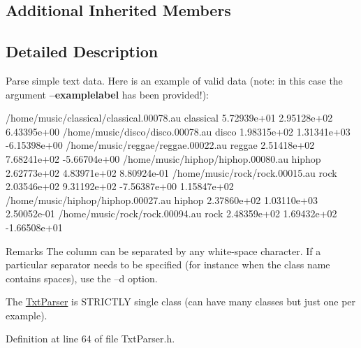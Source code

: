 \subsection*{Additional Inherited Members}


\subsection{Detailed Description}
Parse simple text data. Here is an example of valid data (note\-: in this case the argument {\bfseries --examplelabel} has been provided!)\-: \begin{DoxyVerb}/home/music/classical/classical.00078.au       classical       5.72939e+01     2.95128e+02     6.43395e+00
/home/music/disco/disco.00078.au       disco   1.98315e+02     1.31341e+03     -6.15398e+00
/home/music/reggae/reggae.00022.au     reggae  2.51418e+02     7.68241e+02     -5.66704e+00
/home/music/hiphop/hiphop.00080.au     hiphop  2.62773e+02     4.83971e+02     8.80924e-01
/home/music/rock/rock.00015.au rock    2.03546e+02     9.31192e+02     -7.56387e+00    1.15847e+02
/home/music/hiphop/hiphop.00027.au     hiphop  2.37860e+02     1.03110e+03     2.50052e-01
/home/music/rock/rock.00094.au rock    2.48359e+02     1.69432e+02     -1.66508e+01
\end{DoxyVerb}
 \begin{DoxyRemark}{Remarks}
The column can be separated by any white-\/space character. If a particular separator needs to be specified (for instance when the class name contains spaces), use the --d option. 

The \hyperlink{classMultiBoost_1_1TxtParser}{Txt\-Parser} is S\-T\-R\-I\-C\-T\-L\-Y single class (can have many classes but just one per example). 
\end{DoxyRemark}


Definition at line 64 of file Txt\-Parser.\-h.



